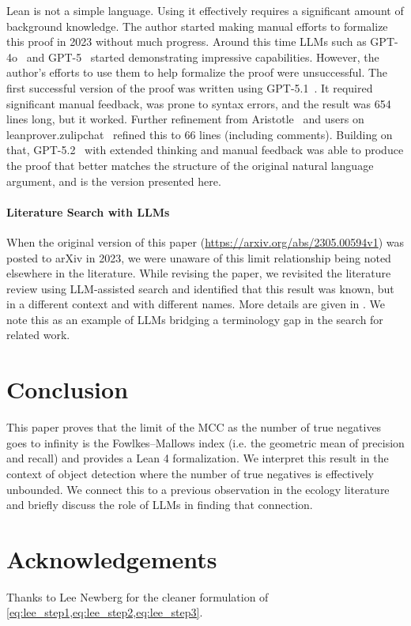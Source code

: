 \documentclass{article}
\makeatletter
\newcommand{\ie}{i.e.\@\xspace}
\makeatother
\begin{document}
Lean is not a simple language.
Using it effectively requires a significant amount of background knowledge.
The author started making manual efforts to formalize this proof in 2023 without much progress.
Around this time LLMs such as GPT-4o~\cite{openai_gpt4o_system_card} and
  GPT-5~\cite{openai_gpt5_system_card} started demonstrating impressive capabilities.
However, the author's efforts to use them to help formalize the proof were unsuccessful.
The first successful version of the proof was written using
  GPT-5.1~\cite{openai_gpt51_system_card_addendum}.
It required significant manual feedback, was prone to syntax errors, and the result was 654 lines long, but
  it worked.
Further refinement from Aristotle~\cite{achim2025aristotleimolevelautomatedtheorem} and users on
  leanprover.zulipchat~\cite{crall2025zulip561031593} refined this to 66 lines (including comments).
Building on that, GPT-5.2~\cite{openai_gpt52_system_card} with extended thinking and manual feedback was
  able to produce the proof that better matches the structure of the original natural language argument, and
  is the version presented here.

\paragraph{Literature Search with LLMs}

When the original version of this paper (\url{https://arxiv.org/abs/2305.00594v1}) was posted to arXiv in
  2023, we were unaware of this limit relationship being noted elsewhere in the literature.
While revising the paper, we revisited the literature review using LLM-assisted search and identified that
  this result was known, but in a different context and with different names.
More details are given in .
We note this as an example of LLMs bridging a terminology gap in the search for related work.


\section{Conclusion}\label{sec:conclusion}

This paper proves that the limit of the MCC as the number of true negatives goes to infinity is the
  Fowlkes--Mallows index (\ie{} the geometric mean of precision and recall) and provides a Lean 4
  formalization.
We interpret this result in the context of object detection where the number of true negatives is
  effectively unbounded.
We connect this to a previous observation in the ecology literature and briefly discuss the role of LLMs in
  finding that connection.

\section{Acknowledgements}\label{sec:ack}

Thanks to Lee Newberg for the cleaner formulation of \cref{eq:lee_step1,eq:lee_step2,eq:lee_step3}.



\end{document}
